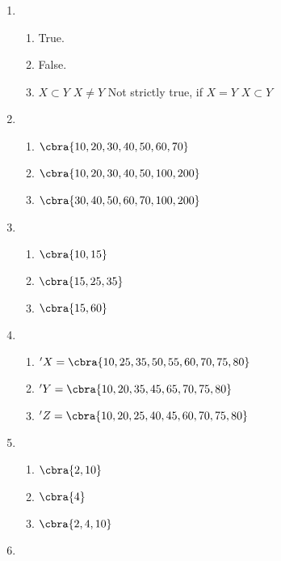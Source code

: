 \documentclass{article}
\begin{document}
\begin{enumerate}
    \item \begin{enumerate}
        \item True. 
        \item False.
        \item $X\subset Y$ $X\ne Y$ Not strictly true, if $X=Y$ $X\subset Y$
    \end{enumerate}
    \item \begin{enumerate}
        \item $\cbra{10, 20, 30, 40, 50, 60, 70} $
        \item $\cbra{10, 20, 30, 40, 50, 100, 200}$
        \item $\cbra{30, 40, 50, 60, 70, 100, 200}$
    \end{enumerate}
    \item \begin{enumerate}
            \item $\cbra{10, 15}$
            \item $\cbra{15, 25, 35}$
            \item $\cbra{15, 60}$
    \end{enumerate}
    \item \begin{enumerate}
        \item $'X=\cbra{10, 25, 35, 50, 55, 60, 70, 75, 80}$
        \item $'Y=\cbra{10, 20, 35, 45, 65, 70, 75, 80}$
        \item $'Z=\cbra{10, 20, 25, 40, 45, 60, 70, 75, 80}$
    \end{enumerate}
    \item \begin{enumerate}
        \item $\cbra{2, 10}$
        \item $\cbra{4}$
        \item $\cbra{2, 4, 10}$
    \end{enumerate}
    \item 
\end{enumerate}
\end{document}
